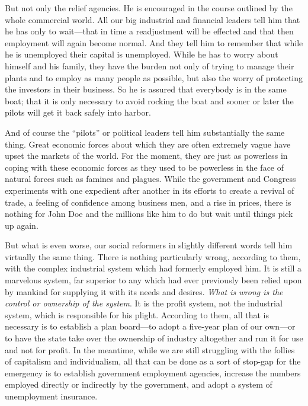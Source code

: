 \documentclass{book}
\begin{document}
But not only the relief agencies. He is encouraged in the course outlined by the whole commercial world. All our big industrial and financial leaders tell him that he has only to wait—that in time a readjustment will be effected and that then employment will again become normal. And they tell him to remember that while he is unemployed their capital is unemployed. While he has to worry about himself and his family, they have the burden not only of trying to manage their plants and to employ as many people as possible, but also the worry of protecting the investors in their business. So he is assured that everybody is in the same boat; that it is only necessary to avoid rocking the boat and sooner or later the pilots will get it back safely into harbor.

And of course the “pilots” or political leaders tell him substantially the same thing. Great economic forces about which they are often extremely vague have upset the markets of the world. For the moment, they are just as powerless in coping with these economic forces as they used to be powerless in the face of natural forces such as famines and plagues. While the government and Congress experiments with one expedient after another in its efforts to create a revival of trade, a feeling of confidence among business men, and a rise in prices, there is nothing for John Doe and the millions like him to do but wait until things pick up again.

But what is even worse, our social reformers in slightly different words tell him virtually the same thing. There is nothing particularly wrong, according to them, with the complex industrial system which had formerly employed him. It is still a marvelous system, far superior to any which had ever previously been relied upon by mankind for supplying it with its needs and desires. \emph{What is wrong is the control or ownership of the system}. It is the profit system, not the industrial system, which is responsible for his plight. According to them, all that is necessary is to establish a plan board—to adopt a five-year plan of our own—or to have the state take over the ownership of industry altogether and run it for use and not for profit. In the meantime, while we are still struggling with the follies of capitalism and individualism, all that can be done as a sort of stop-gap for the emergency is to establish government employment agencies, increase the numbers employed directly or indirectly by the government, and adopt a system of unemployment insurance.
\end{document}

